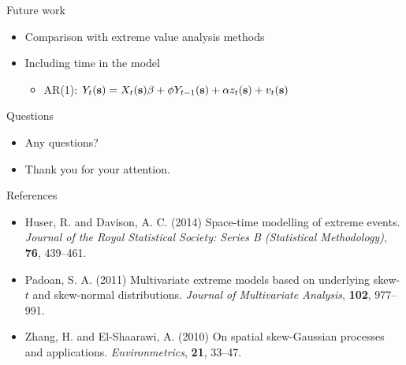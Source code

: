 \documentclass{beamer}
\begin{document}
\begin{frame}{Future work}
  \begin{itemize} \setlength{\itemsep}{0.5em}
    \item Comparison with extreme value analysis methods
    \item Including time in the model
    \begin{itemize}
      \item AR(1): $Y_t(\mbox{\bf s}) = X_t(\mbox{\bf s}) \beta + \phi Y_{t-1}(\mbox{\bf s}) + \alpha z_t(\mbox{\bf s}) + v_t(\mbox{\bf s})$
    \end{itemize}
  \end{itemize}
\end{frame}

\begin{frame}{Questions}
  \begin{itemize} \setlength{\itemsep}{0.5em}
    \item Any questions?
    \item Thank you for your attention.
  \end{itemize}
\end{frame}

\begin{frame}{References}
  \begin{itemize} \setlength{\itemsep}{0.5em}
    \item Huser, R. and Davison, A. C. (2014) Space-time modelling of extreme events. {\it Journal of the Royal Statistical Society: Series B (Statistical Methodology)}, {\bf 76}, 439--461.
    \item Padoan, S. A. (2011) Multivariate extreme models based on underlying skew-$t$ and skew-normal distributions. {\it Journal of Multivariate Analysis}, {\bf 102}, 977--991.
    \item Zhang, H. and El-Shaarawi, A. (2010) On spatial skew-Gaussian processes and applications. {\it Environmetrics}, {\bf 21}, 33--47.
  \end{itemize}
\end{frame}
\end{document}
